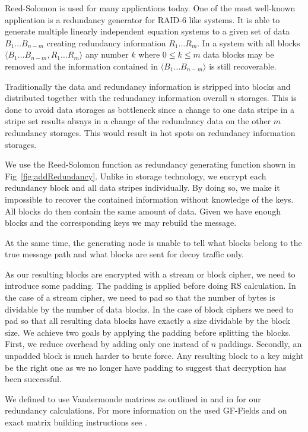 \documentclass[runningheads]{llncs}
\begin{document}
Reed-Solomon is used for many applications today. One of the most well-known application is a redundancy generator for RAID-6 like systems. It is able to generate multiple linearly independent equation systems to a given set of data $B_1\ldots B_{n-m}$ creating redundancy information $R_1\ldots R_m$. In a system with all blocks $\langle B_1\ldots B_{n-m}, R_1\ldots R_m \rangle$ any number $k$ where $0\le k\le m$ data blocks may be removed and the information contained in $\langle B_1\ldots B_{n-m}\rangle$ is still recoverable. 

Traditionally the data and redundancy information is stripped into blocks and distributed together with the redundancy information overall $n$ storages. This is done to avoid data storages as bottleneck since a change to one data stripe  in a stripe set results always in a change of the redundancy data on the other $m$ redundancy storages. This would result in hot spots on redundancy information storages.

We use the Reed-Solomon function as redundancy generating function shown in Fig~\ref{fig:addRedundancy}. Unlike in storage technology, we encrypt each redundancy block and all data stripes individually. By doing so, we make it impossible to recover the contained information without knowledge of the keys. All blocks do then contain the same amount of data. Given we have enough blocks and the corresponding keys we may rebuild the message. 

At the same time, the generating node is unable to tell what blocks belong to the true message path and what blocks are sent for decoy traffic only. 

As our resulting blocks are encrypted with a stream or block cipher, we need to introduce some padding. The padding is applied before doing RS calculation. In the case of a stream cipher, we need to pad so that the number of bytes is dividable by the number of data blocks. In the case of block ciphers we need to pad so that all resulting data blocks have exactly a size dividable by the block size. We achieve two goals by applying the padding before splitting the blocks. First, we reduce overhead by adding only one instead of $n$ paddings. Secondly, an unpadded block is much harder to brute force. Any resulting block to a key might be the right one as we no longer have padding to suggest that decryption has been successful.

We defined to use Vandermonde matrices as outlined in \cite{pd:96:rs} and in \cite{pd:03:rs} for our redundancy calculations. For more information on the used GF-Fields and on exact matrix building instructions see \cite{messageVortex}.
\end{document}
